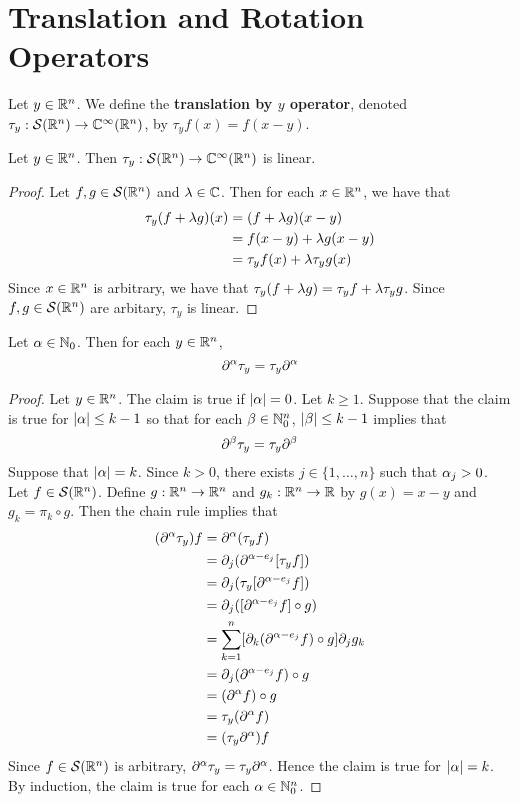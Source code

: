 \documentclass{book}
\begin{document}
	
	\newpage
	\section{Translation and Rotation Operators}
	\begin{defn}
		Let $y \in \mathbb{R}^n$. We define the \textbf{translation by $y$ operator}, denoted $\tau_y: \mathcal{S}(\mathbb{R}^n) \rightarrow \mathbb{C}^{\infty}(\mathbb{R}^n)$, by $\tau_yf(x) = f(x-y)$.
	\end{defn}

	\begin{ex}
		Let $y \in \mathbb{R}^n$. Then $\tau_y: \mathcal{S}(\mathbb{R}^n) \rightarrow \mathbb{C}^{\infty}(\mathbb{R}^n)$ is linear.
	\end{ex}

	\begin{proof}
		 Let $f, g \in \mathcal{S}(\mathbb{R}^n)$ and $\lambda \in \mathbb{C}$. Then for each $x \in \mathbb{R}^n$, we have that
		\begin{align*}
			\tau_y(f + \lambda g)(x) 
			& = (f+ \lambda g)(x-y) \\
			& = f(x -y) + \lambda g(x-y) \\
			& = \tau_y f (x) + \lambda \tau_y g(x)
		\end{align*}
		Since $x \in \mathbb{R}^n$ is arbitrary, we have that $\tau_y (f + \lambda g) = \tau_y f + \lambda \tau_y g$. Since $f, g \in \mathcal{S}(\mathbb{R}^n)$ are arbitary, $\tau_y$ is linear. 
	\end{proof}

	\begin{ex}
		Let $\alpha \in \mathbb{N}_0$.  Then for each $y \in \mathbb{R}^n$, 
		$$\partial^{\alpha}\tau_y = \tau_y \partial^{\alpha}$$
	\end{ex}

	\begin{proof}
		Let $y \in \mathbb{R}^n$. The claim is true if $|\alpha| = 0$. Let $k \geq 1$. Suppose that the claim is true for $|\alpha| \leq k-1$ so that for each $\beta \in \mathbb{N}_0^n$, $|\beta| \leq k-1$ implies that
		$$\partial^{\beta}\tau_y = \tau_y \partial^{\beta}$$ 
		Suppose that $|\alpha| = k$. Since $k >0$, there exists $j \in \{1, \ldots, n\}$ such that $\alpha_j >0$. Let $f \in \mathcal{S}(\mathbb{R}^n)$. Define $g: \mathbb{R}^n \rightarrow \mathbb{R}^n$ and $g_k : \mathbb{R}^n \rightarrow \mathbb{R}$ by $g(x) = x-y$ and $g_k = \pi_k \circ g$. Then the chain rule implies that
		\begin{align*}
			(\partial^{\alpha} \tau_y) f
			& = \partial^{\alpha}( \tau_y f) \\
			& = \partial_j (\partial^{\alpha-e_j} [\tau_y f]) \\
			& = \partial_j (\tau_y [\partial^{\alpha-e_j} f]) \\
			& = \partial_j ([\partial^{\alpha-e_j} f] \circ g) \\
			& = \sum_{k=1}^n [\partial_k(\partial^{\alpha - e_j} f) \circ g]  \partial_j g_k \\ 
			& = \partial_j(\partial^{\alpha - e_j} f) \circ g \\
			& = (\partial^{\alpha} f) \circ g \\ 
			& = \tau_y ( \partial^{\alpha} f) \\
			& = (\tau_y  \partial^{\alpha}) f
		\end{align*}
		Since $f \in \mathcal{S}(\mathbb{R}^n)$ is arbitrary, $\partial^{\alpha} \tau_y = \tau_y  \partial^{\alpha}$. Hence the claim is true for $|\alpha| = k$. By induction, the claim is true for each $\alpha \in \mathbb{N}_0^n$.
	\end{proof}
\end{document}
